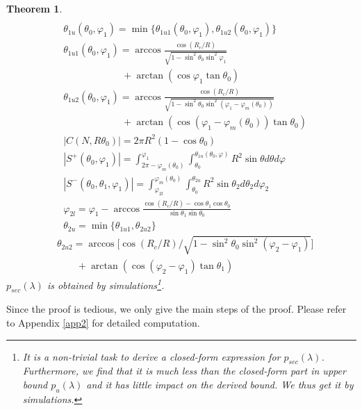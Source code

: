 \documentclass[journal, twoside]{IEEEtran}
\newtheorem{theorem}{Theorem}
\begin{document}
\begin{theorem}
\begin{eqnarray}
	  \end{eqnarray}
	  \begin{align}
	  	  &\theta_{1u}(\theta_0, \varphi_1) = \min \{\theta_{1u1}(\theta_0, \varphi_1), \theta_{1u2}(\theta_0, \varphi_1) \} \label{eqtheta1u} \\
	  	  &\theta_{1u1}(\theta_0, \varphi_1) = \arccos \frac{\cos(R_c/R)}{\sqrt{1-\sin^2\theta_0 \sin^2 \varphi_1}} \label{eqtheta1u1}\\ 
	  	  & \qquad \qquad \qquad + \arctan(\cos \varphi_1 \tan \theta_0) \nonumber \\
	  	  &\theta_{1u2}(\theta_0, \varphi_1) = \arccos \frac{\cos(R_c/R)}{\sqrt{1-\sin^2\theta_0 \sin^2 (\varphi_1-\varphi_m(\theta_0))}} \label{eqtheta1u2}\\
	  	  & \qquad \qquad \qquad + \arctan(\cos (\varphi_1-\varphi_m(\theta_0)) \tan \theta_0)\nonumber \\
	  	  &|C(N, R\theta_0)| = 2\pi R^2(1-\cos \theta_0) \label{eqs}\\
	  	  &|S^+(\theta_0, \varphi_1)| = \int_{2\pi - \varphi_m(\theta_0)}^{\varphi_1} \int_{\theta_0}^{\theta_{1u}(\theta_0, \varphi)} R^2 \sin \theta d\theta d\varphi \label{eqsplus}\\ 
	  	  &|S^-(\theta_0, \theta_1, \varphi_1)| = \int_{\varphi_{2l}}^{\varphi_m(\theta_0)} \int_{\theta_0}^{\theta_{2u}} R^2 \sin \theta_2 d\theta_2 d\varphi_2 \label{eqsminus}\\	  	  
	  	  &\varphi_{2l} = \varphi_1 - \arccos \frac{\cos (R_c/R) - \cos \theta_1 \cos \theta_0}{\sin \theta_1 \sin \theta_0} \nonumber \\	  
	  	     &\theta_{2u} = \min \{\theta_{1u1}, \theta_{2u2} \}\nonumber 
	  	 \end{align}
	  	 	  	  \begin{align}
	  	     &\theta_{2u2} = \arccos \Big [\cos(R_c/R)/\sqrt{1-\sin^2\theta_0 \sin^2 (\varphi_2 - \varphi_1)} \Big] \nonumber\\
	  	     & \qquad + \arctan(\cos (\varphi_2 - \varphi_1) \tan \theta_1)\nonumber
	  \end{align}
	  $p_{sec}(\lambda)$ is obtained by simulations\footnote{It is a non-trivial task to derive a closed-form expression for $p_{sec}(\lambda)$. Furthermore, we find that it is much less than the closed-form part in upper bound $p_u (\lambda)$ and it has little impact on the derived bound. We thus get it by simulations.}.
\end{theorem}


Since the proof is tedious, we only give the main steps of the proof.
Please refer to Appendix \ref{app2} for detailed computation. 
 
\end{document}
